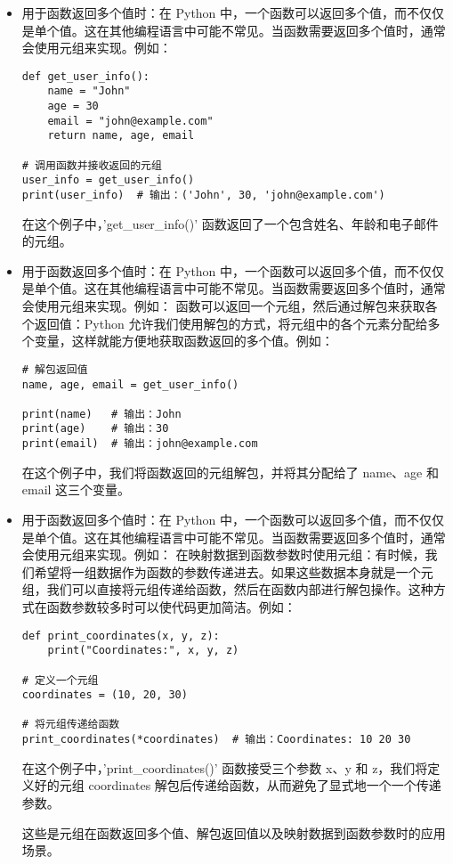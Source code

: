 \documentclass{article}
\begin{document}
\begin{itemize}


    \item 用于函数返回多个值时：在 Python 中，一个函数可以返回多个值，而不仅仅是单个值。这在其他编程语言中可能不常见。当函数需要返回多个值时，通常会使用元组来实现。例如：
 \begin{lstlisting}[caption={示例Python代码}]
def get_user_info():
    name = "John"
    age = 30
    email = "john@example.com"
    return name, age, email

# 调用函数并接收返回的元组
user_info = get_user_info()
print(user_info)  # 输出：('John', 30, 'john@example.com')
 \end{lstlisting}   
在这个例子中，'get\_user\_info()' 函数返回了一个包含姓名、年龄和电子邮件的元组。

\item 用于函数返回多个值时：在 Python 中，一个函数可以返回多个值，而不仅仅是单个值。这在其他编程语言中可能不常见。当函数需要返回多个值时，通常会使用元组来实现。例如：
函数可以返回一个元组，然后通过解包来获取各个返回值：Python 允许我们使用解包的方式，将元组中的各个元素分配给多个变量，这样就能方便地获取函数返回的多个值。例如：
\begin{lstlisting}[caption={示例Python代码}]
# 解包返回值
name, age, email = get_user_info()

print(name)   # 输出：John
print(age)    # 输出：30
print(email)  # 输出：john@example.com
\end{lstlisting}
在这个例子中，我们将函数返回的元组解包，并将其分配给了 name、age 和 email 这三个变量。

\item 用于函数返回多个值时：在 Python 中，一个函数可以返回多个值，而不仅仅是单个值。这在其他编程语言中可能不常见。当函数需要返回多个值时，通常会使用元组来实现。例如：
在映射数据到函数参数时使用元组：有时候，我们希望将一组数据作为函数的参数传递进去。如果这些数据本身就是一个元组，我们可以直接将元组传递给函数，然后在函数内部进行解包操作。这种方式在函数参数较多时可以使代码更加简洁。例如：
\begin{lstlisting}[caption={示例Python代码}]
def print_coordinates(x, y, z):
    print("Coordinates:", x, y, z)

# 定义一个元组
coordinates = (10, 20, 30)

# 将元组传递给函数
print_coordinates(*coordinates)  # 输出：Coordinates: 10 20 30
\end{lstlisting}
在这个例子中，'print\_coordinates()' 函数接受三个参数 x、y 和 z，我们将定义好的元组 coordinates 解包后传递给函数，从而避免了显式地一个一个传递参数。

这些是元组在函数返回多个值、解包返回值以及映射数据到函数参数时的应用场景。
\end{itemize}
\end{document}
